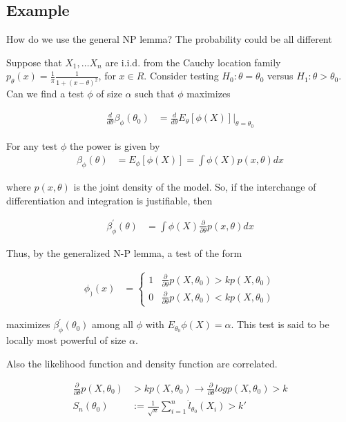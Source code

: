 \documentclass[11pt]{article} %
\begin{document}
\subsection{Example}
How do we use the general NP lemma? The probability could be all different

Suppose that $X_1, … X_n$ are i.i.d. from the Cauchy location family $p_{\theta}(x) = \frac{1}{\pi} \frac{1}{1+ (x-\theta)^2}$, for $x \in R$. Consider testing $H_0: \theta = \theta_0$ versus $H_1: \theta > \theta_0$. Can we find a test $\phi$ of size $\alpha$ such that $\phi$ maximizes

\begin{align*}
	\frac{d}{d \theta} \beta_{\phi} (\theta_0)  &= \frac{d}{d \theta} E_{\theta}[\phi(X)] \Big |_{\theta = \theta_0}
\end{align*}

For any test $\phi$ the power is given by
\begin{align*}
	\beta_{\phi}(\theta) &= E_{\phi}[\phi(X)] = \int \phi(X) p(x, \theta) dx
\end{align*}

where $p(x, \theta)$ is the joint density of the model. So, if the interchange of differentiation and integration is justifiable, then 

\begin{align*}
	\beta_{\phi}^{'}(\theta) &=  \int \phi(X) \frac{\partial}{\partial \theta}p(x, \theta) dx
\end{align*}

Thus, by the generalized N-P lemma, a test of the form

\begin{align*}
	\phi_)(x) &= \begin{cases}
	1 & \frac{\partial}{\partial \theta} p(X, \theta_0) > k p(X, \theta_0) \\
	0 &  \frac{\partial}{\partial \theta} p(X, \theta_0) < k p(X, \theta_0) 
	\end{cases}
\end{align*}

maximizes $\beta^{'}_{\phi}(\theta_0)$ among all $\phi$ with $E_{\theta_0} \phi(X) = \alpha$. This test is said to be locally most powerful of size $\alpha$. 

Also the likelihood function and density function are correlated.

\begin{align*}
	\frac{\partial}{\partial \theta} p(X, \theta_0) & > k p(X, \theta_0) \rightarrow \frac{\partial}{\partial \theta} log p(X, \theta_0) > k\\
	S_n(\theta_0) &:= \frac{1}{\sqrt{n}} \sum_{i=1}^n \dot{l}_{\theta_0} (X_i) > k'
\end{align*}
\end{document}
